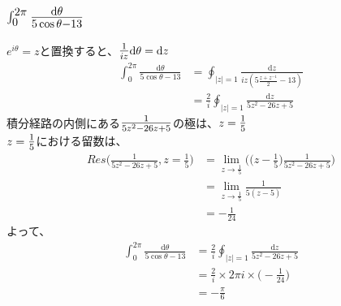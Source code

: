 \documentclass[dvipdfmx,a4paper]{jsarticle}
\begin{document}
\subsection{$\mbox{\Large$\int_{0}^{2\pi}\frac{\mathrm{d}\theta}{5\cos{\theta} - 13}$}$}
$e^{i\theta} = z$と置換すると、$\mbox{\large$\frac{1}{iz}$}\mathrm{d}\theta = \mathrm{d}z$
\begin{align*}
\int_{0}^{2\pi}\frac{\mathrm{d}\theta}{5\cos{\theta} - 13} &= \oint_{|z| = 1}\frac{\mathrm{d}z}{iz(5\frac{z + z^{-1}}{2} - 13)}\\
&= \frac{2}{i}\oint_{|z| = 1}\frac{\mathrm{d}z}{5z^2 - 26z + 5}
\end{align*}
積分経路の内側にある$\mbox{\large$\frac{1}{5z^2 - 26z + 5}$}$の極は、$z = \mbox{\large$\frac{1}{5}$}$\\
$z = \mbox{\large$\frac{1}{5}$}$における留数は、
\begin{align*}
Res\biggl(\frac{1}{5z^2 - 26z + 5}, z = \frac{1}{5}\biggr) &= \lim_{z\to \frac{1}{5}}\biggl(\bigl(z - \frac{1}{5}\bigr)\frac{1}{5z^2 - 26z + 5}\biggr)\\
&= \lim_{z\to \frac{1}{5}}\frac{1}{5(z-5)}\\
&=-\frac{1}{24}
\end{align*}
よって、
\begin{align*}
\int_{0}^{2\pi}\frac{\mathrm{d}\theta}{5\cos{\theta} - 13} &= \frac{2}{i}\oint_{|z| = 1}\frac{\mathrm{d}z}{5z^2 - 26z + 5} \\
&= \frac{2}{i} \times 2\pi i \times \bigl(-\frac{1}{24}\bigr)\\
&= -\frac{\pi}{6}
\end{align*}
\\

\end{document}
